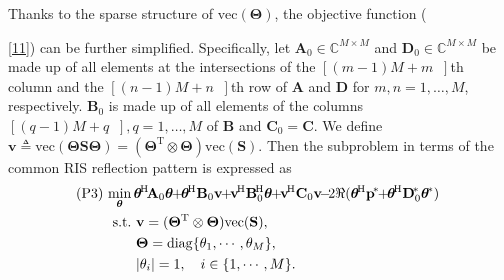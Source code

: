 \documentclass[journal]{IEEEtran}
\begin{document}
 Thanks to the sparse structure of $\mathrm {vec}(\boldsymbol {\Theta })$, the objective function ({\ref{11}) can be further simplified. Specifically, 
  let $\mathbf {A}_{0}\!\in \!\mathbb {C}^{M \times M}$ and $\mathbf{D}_{0} \!\in \!\mathbb {C}^{M \times M}$  be made up of all elements at the intersections of the $[(m\!- \!1) M \!+\!m {\;\;\!\!\!}]$th column and the $[(n - 1) M + n {\;\;\!\!\!}] $th row of 
  $\mathbf {A}$ and $\mathbf {D}$ for $m, n\! \!=\!\! 1,\! \ldots \!{}, M$, respectively. $\mathbf{B}_{0}$ is made up of all elements of the columns $[(q\! - \!1) M + q {\;\;\!\!\!}], q\! \!= \!\!1, \ldots {}, M $ of $\mathbf {B}$ and $\mathbf {C}_{0}\!\!=\!\!\mathbf {C}$. We define $\mathbf {v}\!\triangleq\!\mathrm {vec}(\boldsymbol {\Theta }\mathbf{S} \boldsymbol {\Theta })\!\!=\!\!(\boldsymbol {\Theta}^{\mathrm{T}}\!\otimes\!\boldsymbol {\Theta})\mathrm {vec}(\mathbf{S})$.
  Then the subproblem in terms of the common RIS reflection pattern is expressed as
 \begin{equation} \begin{aligned} \!\!\text {(P3)\!\!\!} \!\quad &\underset { \boldsymbol {\theta}}{\min }~ \!\boldsymbol{\theta}^{\mathrm{\!H}}\!\mathbf{A}_{0} \boldsymbol {\theta} \!\!+\!\! \boldsymbol {\theta}^{\mathrm{\!H}}\mathbf{B}_{0}\mathbf {v} \!\! +\!\! \mathbf {v}^{\mathrm{\!H}} {\mathbf {B}} ^{\mathrm{\!H}}_{0}\boldsymbol {\theta} 
     \!\! + \!\!\mathbf {v}^{\mathrm{\!H}} \mathbf {C}_{0} \mathbf {v} 
{\!-\!2{\Re}(\boldsymbol {\theta }^{\mathrm{\!H}}\mathbf{p}^{\!\ast}\!\!+\!\!\boldsymbol {\theta}^{\mathrm{\!H}} \mathbf {D}_{0}^{\!\ast} \boldsymbol {\theta}^{\!\ast})}
      \\ & ~\text {s.t.}~
       \mathbf {v}=(\boldsymbol {\Theta}^{\mathrm{T}}\otimes\boldsymbol {\Theta})\mathrm {vec}(\mathbf{S}),
      \\ &\hphantom { ~\text {s.t.}~}\mathbf {\Theta }= \mathop {\mathrm {diag}}\nolimits \{\theta  _{1},\cdots,\theta  _{M}\},
      \\ &\hphantom { ~\text {s.t.}~} |\theta  _{i}|=1, \quad i\in \{1,\cdots,M\} .
       \end{aligned}\end{equation}

}
\end{document}
